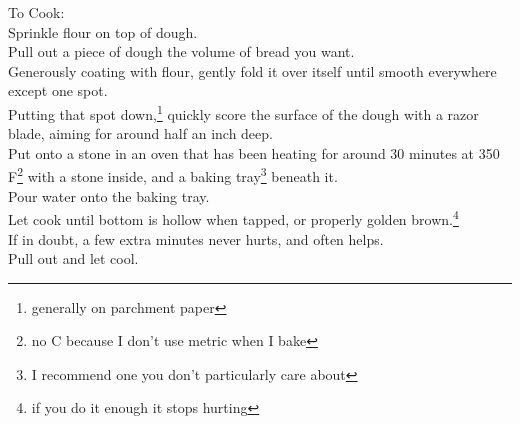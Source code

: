\documentclass[12pt]{article}[titlepage]
\newcommand{\1}{\={a}}
\newcommand{\2}{\={e}}
\newcommand{\3}{\={\i}}
\newcommand{\4}{\=o}
\newcommand{\5}{\=u}
\newcommand{\6}{\={A}}
\renewcommand{\,}{\textsuperscript{,}}
\begin{document}
To Cook:\\
Sprinkle flour on top of dough.\\
Pull out a piece of dough the volume of bread you want.\\
Generously coating with flour, gently fold it over itself until smooth everywhere except one spot.\\
Putting that spot down,\footnote{generally on parchment paper} quickly score the surface of the dough with a razor blade, aiming for around half an inch deep.\\
Put onto a stone in an oven that has been heating for around 30 minutes at 350 F\footnote{no C because I don't use metric when I bake} with a stone inside, and a baking tray\footnote{I recommend one you don't particularly care about} beneath it.\\
Pour water onto the baking tray.\\
Let cook until bottom is hollow when tapped, or properly golden brown.\footnote{if you do it enough it stops hurting}\\
If in doubt, a few extra minutes never hurts, and often helps.\\
Pull out and let cool.\\
\end{document}
